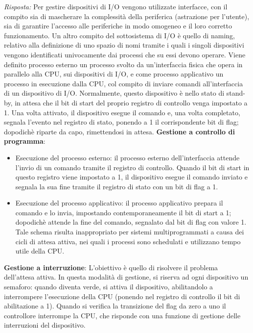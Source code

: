 \documentclass{article}
\newenvironment{solution}
    {\textit{Risposta:}}
    {}
\begin{document}
\begin{solution}
Per gestire dispositivi di I/O vengono utilizzate interfacce, con il compito sia di mascherare la complessità della periferica (astrazione per l’utente), sia di garantire l’accesso alle periferiche in modo omogeneo e il loro corretto funzionamento.
\newline
\newline
Un altro compito del sottosistema di I/O è quello di naming, relativo alla definizione di uno spazio di nomi tramite i quali i singoli dispositivi vengono identificati univocamente dai processi che su essi devono operare.
\newline
Viene definito processo esterno un processo svolto da un’interfaccia fisica che opera in parallelo alla CPU, sui dispositivi di I/O, e come processo applicativo un processo in esecuzione dalla CPU, col compito di inviare comandi all’interfaccia di un dispositivo di I/O.
\newline
Normalmente, questo dispositivo è nello stato di stand-by, in attesa che il bit di start del proprio registro di controllo venga impostato a 1.
\newline
Una volta attivato, il dispositivo esegue il comando e, una volta completato, segnala l'evento nel registro di stato, ponendo a 1 il corrispondente bit di flag; dopodichè riparte da capo, rimettendosi in attesa.
\newline
\newline
\textbf{Gestione a controllo di programma}:
\begin{itemize}
    \item Esecuzione del processo esterno: il processo esterno dell’interfaccia attende l’invio di un comando tramite il registro di controllo. Quando il bit di start in questo registro viene impostato a 1, il dispositivo esegue il comando inviato e segnala la sua fine tramite il registro di stato con un bit di flag a 1.
    \item Esecuzione del processo applicativo: il processo applicativo prepara il comando e lo invia, impostando contemporaneamente il bit di start a 1; dopodichè attende la fine del comando, segnalato dal bit di flag con valore 1.
    \newline
    Tale schema risulta inappropriato per sistemi multiprogrammati a causa dei cicli di attesa attiva, nei quali i processi sono schedulati e utilizzano tempo utile della CPU.
\end{itemize}
\textbf{Gestione a interruzione}:
\newline
L’obiettivo è quello di risolvere il problema dell’attesa attiva.
\newline
In questa modalità di gestione, si riserva ad ogni dispositivo un semaforo: quando diventa verde, si attiva il dispositivo, abilitandolo a interrompere l’esecuzione della CPU (ponendo nel registro di controllo il bit di abilitazione a 1).
\newline
Quando si verifica la transizione del flag da zero a uno il controllore interrompe la CPU, che risponde con una funzione di gestione delle interruzioni del dispositivo.
\end{solution}
\end{document}
